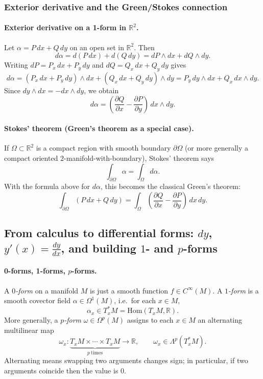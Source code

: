 \documentclass[12pt,a4paper]{article}
\theoremstyle{plain}
\theoremstyle{definition}      %
\begin{document}
\subsubsection*{Exterior derivative and the Green/Stokes connection}

\paragraph{Exterior derivative on a 1-form in $\mathbb{R}^2$.}
Let $\alpha=P\,dx+Q\,dy$ on an open set in $\mathbb{R}^2$. Then
\[
d\alpha = d(P\,dx)+d(Q\,dy)=dP\wedge dx + dQ\wedge dy.
\]
Writing $dP=P_x\,dx+P_y\,dy$ and $dQ=Q_x\,dx+Q_y\,dy$ gives
\[
d\alpha = (P_x\,dx+P_y\,dy)\wedge dx + (Q_x\,dx+Q_y\,dy)\wedge dy
= P_y\,dy\wedge dx + Q_x\,dx\wedge dy.
\]
Since $dy\wedge dx=-dx\wedge dy$, we obtain
\[
d\alpha = \left(\frac{\partial Q}{\partial x}-\frac{\partial P}{\partial y}\right)\,dx\wedge dy.
\]

\paragraph{Stokes' theorem (Green's theorem as a special case).}
If $\Omega\subset\mathbb{R}^2$ is a compact region with smooth boundary $\partial\Omega$
(or more generally a compact oriented $2$-manifold-with-boundary),
Stokes' theorem says
\[
\int_{\partial\Omega}\alpha = \int_{\Omega} d\alpha.
\]
With the formula above for $d\alpha$, this becomes the classical Green's theorem:
\[
\int_{\partial\Omega} (P\,dx+Q\,dy)
=
\int_{\Omega} \left(\frac{\partial Q}{\partial x}-\frac{\partial P}{\partial y}\right)\,dx\,dy.
\]


\subsection*{From calculus to differential forms: $dy$, $y'(x)=\frac{dy}{dx}$, and building $1$- and $p$-forms}

\paragraph{0-forms, 1-forms, $p$-forms.}
A \emph{$0$-form} on a manifold $M$ is just a smooth function $f\in C^\infty(M)$.
A \emph{$1$-form} is a smooth covector field $\alpha\in\Omega^1(M)$, i.e.\ for each $x\in M$,
\[
\alpha_x \in T_x^*M=\mathrm{Hom}(T_xM,\mathbb{R}).
\]
More generally, a \emph{$p$-form} $\omega\in\Omega^p(M)$ assigns to each $x\in M$ an alternating multilinear map
\[
\omega_x : \underbrace{T_xM\times\cdots\times T_xM}_{p\ \text{times}} \to \mathbb{R},
\qquad \omega_x \in \Lambda^p(T_x^*M).
\]
Alternating means swapping two arguments changes sign; in particular, if two arguments coincide then the value is $0$.
\end{document}
